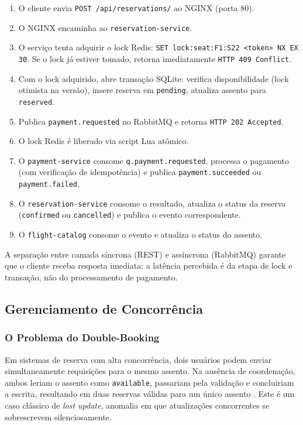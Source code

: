 \documentclass[12pt]{article}
\begin{document}
\begin{enumerate}
  \item O cliente envia \texttt{POST /api/reservations/} ao NGINX (porta 80).
  \item O NGINX encaminha ao \texttt{reservation-service}.
  \item O serviço tenta adquirir o lock Redis: \texttt{SET lock:seat:F1:S22 <token> NX EX 30}.
        Se o lock já estiver tomado, retorna imediatamente \texttt{HTTP 409 Conflict}.
  \item Com o lock adquirido, abre transação SQLite: verifica disponibilidade (lock
        otimista na versão), insere reserva em \texttt{pending}, atualiza assento para
        \texttt{reserved}.
  \item Publica \texttt{payment.requested} no RabbitMQ e retorna \texttt{HTTP 202 Accepted}.
  \item O lock Redis é liberado via script Lua atômico.
  \item O \texttt{payment-service} consome \texttt{q.payment.requested}, processa o
        pagamento (com verificação de idempotência) e publica \texttt{payment.succeeded}
        ou \texttt{payment.failed}.
  \item O \texttt{reservation-service} consome o resultado, atualiza o status da reserva
        (\texttt{confirmed} ou \texttt{cancelled}) e publica o evento correspondente.
  \item O \texttt{flight-catalog} consome o evento e atualiza o status do assento.
\end{enumerate}

A separação entre camada síncrona (REST) e assíncrona (RabbitMQ) garante que o cliente
receba resposta imediata: a latência percebida é da etapa de lock e transação, não do
processamento de pagamento.

\subsection{Gerenciamento de Concorrência}

\subsubsection{O Problema do Double-Booking}

Em sistemas de reserva com alta concorrência, dois usuários podem enviar
simultaneamente requisições para o mesmo assento. Na ausência de coordenação, ambos
leriam o assento como \texttt{available}, passariam pela validação e concluiriam a
escrita, resultando em duas reservas válidas para um único assento
\cite{gray92}. Este é um caso clássico de \textit{lost update}, anomalia em que
atualizações concorrentes se sobrescrevem silenciosamente.
\end{document}
